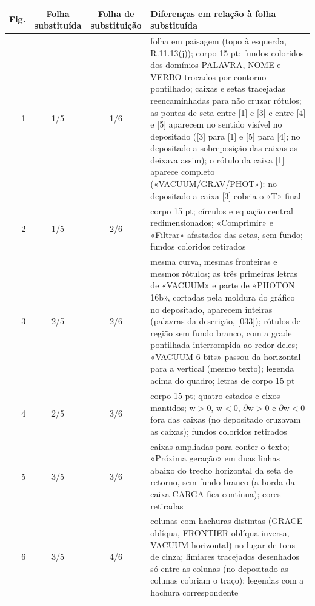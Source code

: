 \documentclass[a4paper,11pt]{article}
\begin{document}
{\small\begin{longtable}{|r|c|c|p{9.4cm}|}\hline \textbf{Fig.} & \textbf{Folha substituída} & \textbf{Folha de substituição} & \textbf{Diferenças em relação à folha substituída}\\\hline\endhead

1 & 1/5 & 1/6 & folha em paisagem (topo à esquerda, R.11.13(j)); corpo 15 pt; fundos coloridos dos domínios PALAVRA, NOME e VERBO trocados por contorno pontilhado; caixas e setas tracejadas reencaminhadas para não cruzar rótulos; as pontas de seta entre [1] e [3] e entre [4] e [5] aparecem no sentido visível no depositado ([3] para [1] e [5] para [4]; no depositado a sobreposição das caixas as deixava assim); o rótulo da caixa [1] aparece completo («VACUUM/GRAV/PHOT»): no depositado a caixa [3] cobria o «T» final\\\hline

2 & 1/5 & 2/6 & corpo 15 pt; círculos e equação central redimensionados; «Comprimir» e «Filtrar» afastados das setas, sem fundo; fundos coloridos retirados\\\hline

3 & 2/5 & 2/6 & mesma curva, mesmas fronteiras e mesmos rótulos; as três primeiras letras de «VACUUM» e parte de «PHOTON 16b», cortadas pela moldura do gráfico no depositado, aparecem inteiras (palavras da descrição, [033]); rótulos de região sem fundo branco, com a grade pontilhada interrompida ao redor deles; «VACUUM 6 bits» passou da horizontal para a vertical (mesmo texto); legenda acima do quadro; letras de corpo 15 pt\\\hline

4 & 2/5 & 3/6 & corpo 15 pt; quatro estados e eixos mantidos; w$>$0, w$<$0, $\partial$w$>$0 e $\partial$w$<$0 fora das caixas (no depositado cruzavam as caixas); fundos coloridos retirados\\\hline

5 & 3/5 & 3/6 & caixas ampliadas para conter o texto; «Próxima geração» em duas linhas abaixo do trecho horizontal da seta de retorno, sem fundo branco (a borda da caixa CARGA fica contínua); cores retiradas\\\hline

6 & 3/5 & 4/6 & colunas com hachuras distintas (GRACE oblíqua, FRONTIER oblíqua inversa, VACUUM horizontal) no lugar de tons de cinza; limiares tracejados desenhados só entre as colunas (no depositado as colunas cobriam o traço); legendas com a hachura correspondente\\\hline


\end{longtable}}
\end{document}
